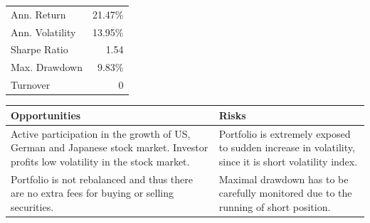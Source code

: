 \documentclass[11pt, parskip=full, DIV=14]{scrreprt}
\begin{document}
\vspace{\abovedisplayskip}
\begin{minipage}{0.65\textwidth}
\end{minipage}
\begin{minipage}{0.35\textwidth}
\begin{tabular}{lr}
\toprule
Ann. Return & 21.47\%\\
Ann. Volatility & 13.95\%\\
Sharpe Ratio & 1.54 \\
Max. Drawdown & 9.83\% \\
Turnover & 0\\
\bottomrule
\end{tabular}
\end{minipage}

\begin{table}[H]
\begin{tabularx}{\textwidth}{XX}
  \toprule
  \textbf{\textsf{Opportunities}} & \textbf{\textsf{Risks}} \\
  \midrule
Active participation in the growth of US, German and Japanese stock market. Investor profits low volatility in the stock market. &
Portfolio is extremely exposed to sudden increase in volatility, since it is short volatility index.\\[1em]
Portfolio is not rebalanced and thus there are no extra fees for buying or selling securities. &
Maximal drawdown has to be carefully monitored due to the running of short position.\\
  \bottomrule
\end{tabularx}
\end{table}
\end{document}
